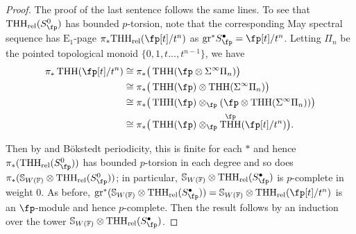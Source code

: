 \documentclass[english,10pt]{amsart}
\newcommand{\sphwf}{\mathbb{S}_{W(\mathbb{F)}}}
\newcommand{\rel}{\textup{rel}}
\theoremstyle{definition}
\numberwithin{equation}{section}
\DeclareMathOperator{\thh}{\ensuremath{\textup{THH}}}
\newcommand{\rthh}{\mathrm{THH}_{\rel}}
\newcommand{\pis}{\pi_*}
\newcommand{\gr}{\textup{gr}^*}
\begin{document}
\begin{proof}
The proof of the last sentence follows the same lines. To see that $\rthh(S_{\fp}^0)$ has bounded $p$-torsion,  note that the corresponding May spectral sequence has $\mathrm{E}_1$-page $\pis \rthh(\fp[t]/t^n)$ as $\gr S_{\fp}^\bullet = \fp[t]/t^n$. Letting $\Pi_n$ be the pointed topological monoid $\{0,1,t...,t^{n-1}\}$, we have 
\begin{equation}\label{eq splitting for thh of truncated polynomial}
    \begin{split}
        \pis \thh(\fp[t]/t^n) &\cong \pis \big(\thh(\fp\otimes \Sigma^{\infty} \Pi_n)\big) \\
        &\cong \pis\big(\thh(\fp) \otimes \thh(\Sigma^{\infty} \Pi_n)\big)\\
        &\cong \pis\big(\thh(\fp) \otimes_{\fp} ( \fp \otimes \thh(\Sigma^{\infty} \Pi_n)) \big)\\
        &\cong \pis \big(\thh(\fp) \otimes_{\fp} \thh^{\fp}(\fp[t]/t^n) \big).
    \end{split}
\end{equation}

Then by \cite[Proposition 3]{speirs2020truncatedpolynomial} and B\"okstedt periodicity, this is finite for each $*$ and hence $\pis (\thh_{\rel}(S_{\fp}^0))$ has bounded $p$-torsion in each degree and so does $\pis(\sphwf \otimes \rthh(S_{\fp}^0))$; in particular, $\sphwf \otimes \rthh(S_{\fp}^\bullet)$ is $p$-complete in weight $0$. As before, $\gr (\sphwf\otimes \rthh(S_{\fp}^\bullet)) = \sphwf \otimes \rthh(\fp[t]/t^n)$ is an $\fp$-module and hence $p$-complete. Then the result follows by an induction over the tower $\sphwf \otimes \rthh(S_{\fp}^\bullet)$.
\end{proof}
\end{document}
